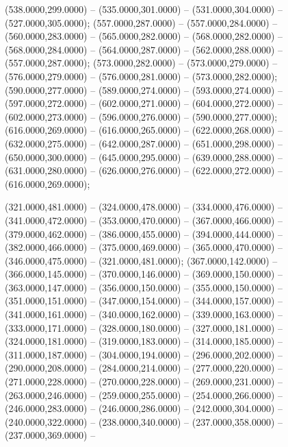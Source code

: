 \begin{scope}[shift={(-231.87,-121.87)}]
\begin{scope}[draw=black,fill=cffffbf,line join=round,line width=0.208pt]
        (538.0000,299.0000) -- (535.0000,301.0000) -- (531.0000,304.0000) --
        (527.0000,305.0000);
       (557.0000,287.0000) -- (557.0000,284.0000) --
        (560.0000,283.0000) -- (565.0000,282.0000) -- (568.0000,282.0000) --
        (568.0000,284.0000) -- (564.0000,287.0000) -- (562.0000,288.0000) --
        (557.0000,287.0000);
       (573.0000,282.0000) -- (573.0000,279.0000) --
        (576.0000,279.0000) -- (576.0000,281.0000) -- (573.0000,282.0000);
       (590.0000,277.0000) -- (589.0000,274.0000) --
        (593.0000,274.0000) -- (597.0000,272.0000) -- (602.0000,271.0000) --
        (604.0000,272.0000) -- (602.0000,273.0000) -- (596.0000,276.0000) --
        (590.0000,277.0000);
       (616.0000,269.0000) -- (616.0000,265.0000) --
        (622.0000,268.0000) -- (632.0000,275.0000) -- (642.0000,287.0000) --
        (651.0000,298.0000) -- (650.0000,300.0000) -- (645.0000,295.0000) --
        (639.0000,288.0000) -- (631.0000,280.0000) -- (626.0000,276.0000) --
        (622.0000,272.0000) -- (616.0000,269.0000);
  \end{scope}
  \begin{scope}[draw=black,fill=cabdda4,line join=round,line width=0.208pt]
       (321.0000,481.0000) -- (324.0000,478.0000) --
        (334.0000,476.0000) -- (341.0000,472.0000) -- (353.0000,470.0000) --
        (367.0000,466.0000) -- (379.0000,462.0000) -- (386.0000,455.0000) --
        (394.0000,444.0000) -- (382.0000,466.0000) -- (375.0000,469.0000) --
        (365.0000,470.0000) -- (346.0000,475.0000) -- (321.0000,481.0000);
       (367.0000,142.0000) -- (366.0000,145.0000) --
        (370.0000,146.0000) -- (369.0000,150.0000) -- (363.0000,147.0000) --
        (356.0000,150.0000) -- (355.0000,150.0000) -- (351.0000,151.0000) --
        (347.0000,154.0000) -- (344.0000,157.0000) -- (341.0000,161.0000) --
        (340.0000,162.0000) -- (339.0000,163.0000) -- (333.0000,171.0000) --
        (328.0000,180.0000) -- (327.0000,181.0000) -- (324.0000,181.0000) --
        (319.0000,183.0000) -- (314.0000,185.0000) -- (311.0000,187.0000) --
        (304.0000,194.0000) -- (296.0000,202.0000) -- (290.0000,208.0000) --
        (284.0000,214.0000) -- (277.0000,220.0000) -- (271.0000,228.0000) --
        (270.0000,228.0000) -- (269.0000,231.0000) -- (263.0000,246.0000) --
        (259.0000,255.0000) -- (254.0000,266.0000) -- (246.0000,283.0000) --
        (246.0000,286.0000) -- (242.0000,304.0000) -- (240.0000,322.0000) --
        (238.0000,340.0000) -- (237.0000,358.0000) -- (237.0000,369.0000) --

\end{scope}
\end{scope}
